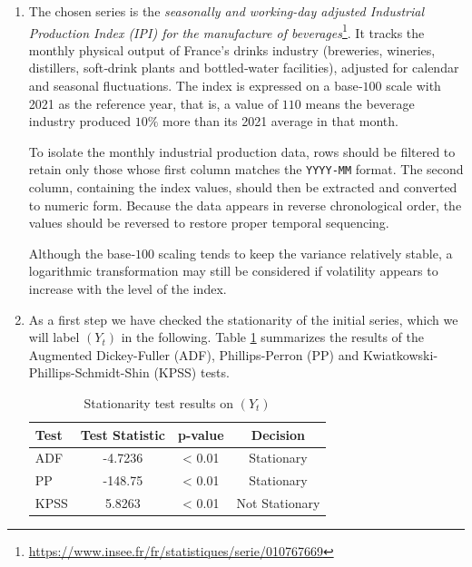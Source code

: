 \documentclass[12pt]{article}
\begin{document}
    \begin{enumerate}
        \item The chosen series is the \emph{seasonally and working-day adjusted Industrial Production Index (IPI) for the manufacture of beverages}\footnote{\url{https://www.insee.fr/fr/statistiques/serie/010767669}}. It tracks the monthly physical output of France’s drinks industry (breweries, wineries, distillers, soft‑drink plants and bottled‑water facilities), adjusted for calendar and seasonal fluctuations. The index is expressed on a base‑$100$ scale with 2021 as the reference year, that is, a value of $110$ means the beverage industry produced $10 \%$ more than its 2021 average in that month.

        To isolate the monthly industrial production data, rows should be filtered to retain only those whose first column matches the \texttt{YYYY-MM} format. The second column, containing the index values, should then be extracted and converted to numeric form. Because the data appears in reverse chronological order, the values should be reversed to restore proper temporal sequencing.

        Although the base‑$100$ scaling tends to keep the variance relatively stable, a logarithmic transformation may still be considered if volatility appears to increase with the level of the index.

        \item As a first step we have checked the stationarity of the initial series, which we will label $(Y_t)$ in the following. Table \ref{tab:stationarity_tests} summarizes the results of the Augmented Dickey-Fuller (ADF), Phillips-Perron (PP) and Kwiatkowski-Phillips-Schmidt-Shin (KPSS) tests.
        \begin{table}[ht]
            \centering
            \begin{tabular}{l|ccc}
                \textbf{Test} & \textbf{Test Statistic} & \textbf{p-value} & \textbf{Decision} \\
                \hline
                ADF  & -4.7236 & < 0.01 & Stationary \\
                PP   & -148.75 & < 0.01 & Stationary \\
                KPSS & 5.8263  & < 0.01 & Not Stationary
            \end{tabular}
            \caption{Stationarity test results on $(Y_t)$}
            \label{tab:stationarity_tests}
        \end{table}
        

\end{enumerate}
\end{document}
